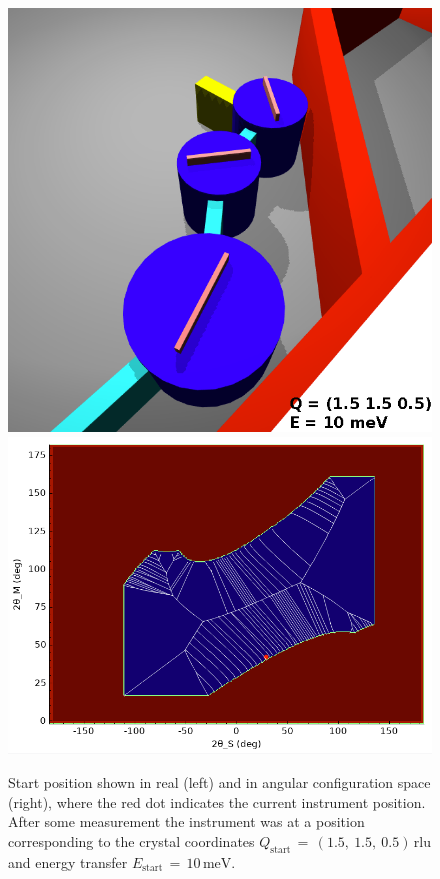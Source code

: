 \begin{figure}[H]
		\begin{center}
			\includegraphics[width = 0.4 \textwidth]{figures/casestudy_15_15_05_10meV}
			\hspace{0.5cm}
			\includegraphics[width = 0.55 \textwidth]{figures/casestudy_15_15_05_10meV_cfg}
		\end{center}
	\caption[Case study: Start position.]{Start position shown in real (left) and in angular configuration space (right), 
		where the red dot indicates the current instrument position. 
		After some measurement the instrument was at a position
		corresponding to the crystal coordinates $Q_\mathrm{start}\,=\,\left(1.5,\ 1.5,\ 0.5\right)\, \mathrm{rlu}$ and 
		energy transfer $E_\mathrm{start}\,=\,10\, \mathrm{meV}$.
		\label{fig:casestudy_start}}
\end{figure}

